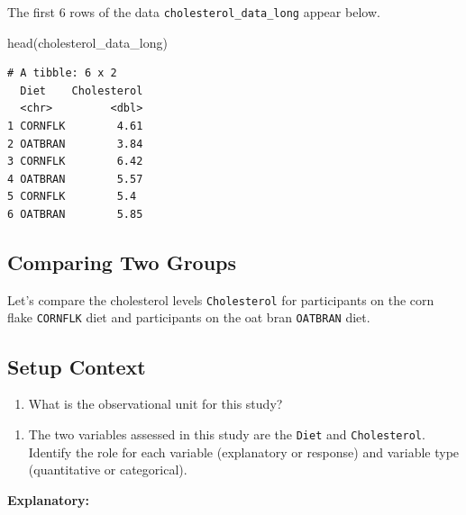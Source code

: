 \documentclass[
  letterpaper,
  DIV=11,
  numbers=noendperiod]{scrartcl}
\newenvironment{Shaded}{\begin{snugshade}}{\end{snugshade}}
\newcommand{\FunctionTok}[1]{\textcolor[rgb]{0.28,0.35,0.67}{#1}}
\newcommand{\NormalTok}[1]{\textcolor[rgb]{0.00,0.23,0.31}{#1}}
\providecommand{\tightlist}{%
  \setlength{\itemsep}{0pt}\setlength{\parskip}{0pt}}\usepackage{longtable,booktabs,array}
\begin{document}
The first 6 rows of the data \texttt{cholesterol\_data\_long} appear
below.

\begin{Shaded}
\begin{Highlighting}[]
\FunctionTok{head}\NormalTok{(cholesterol\_data\_long)}
\end{Highlighting}
\end{Shaded}

\begin{verbatim}
# A tibble: 6 x 2
  Diet    Cholesterol
  <chr>         <dbl>
1 CORNFLK        4.61
2 OATBRAN        3.84
3 CORNFLK        6.42
4 OATBRAN        5.57
5 CORNFLK        5.4 
6 OATBRAN        5.85
\end{verbatim}

\hypertarget{comparing-two-groups}{%
\subsection{Comparing Two Groups}\label{comparing-two-groups}}

Let's compare the cholesterol levels \texttt{Cholesterol} for
participants on the corn flake \texttt{CORNFLK} diet and participants on
the oat bran \texttt{OATBRAN} diet.

\hypertarget{setup-context}{%
\subsection{Setup Context}\label{setup-context}}

\begin{enumerate}
\def\labelenumi{\arabic{enumi}.}
\tightlist
\item
  What is the observational unit for this study?
\end{enumerate}

\vspace{0.5in}

\begin{enumerate}
\def\labelenumi{\arabic{enumi}.}
\setcounter{enumi}{1}
\tightlist
\item
  The two variables assessed in this study are the \texttt{Diet} and
  \texttt{Cholesterol}. Identify the role for each variable (explanatory
  or response) and variable type (quantitative or categorical).
\end{enumerate}

\vspace{0.5in}

\textbf{Explanatory:}
\end{document}
